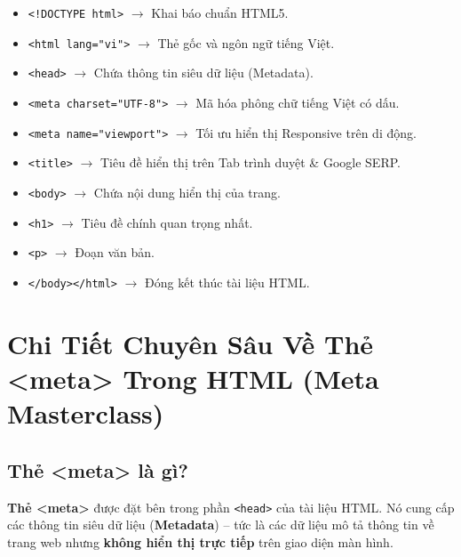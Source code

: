 \documentclass[11pt,oneside]{book}
\newcommand{\codeinline}[1]{\textcolor{accentOrange}{\texttt{#1}}}
\newcommand{\term}[1]{\textbf{\textcolor{primaryBlue}{#1}}}
\begin{document}
\begin{noteBox}
\begin{itemize}[leftmargin=1.2em, itemsep=2pt, parsep=0pt]
    \item \codeinline{<!DOCTYPE html>} $\rightarrow$ Khai báo chuẩn HTML5.
    \item \codeinline{<html lang="vi">} $\rightarrow$ Thẻ gốc và ngôn ngữ tiếng Việt.
    \item \codeinline{<head>} $\rightarrow$ Chứa thông tin siêu dữ liệu (Metadata).
    \item \codeinline{<meta charset="UTF-8">} $\rightarrow$ Mã hóa phông chữ tiếng Việt có dấu.
    \item \codeinline{<meta name="viewport">} $\rightarrow$ Tối ưu hiển thị Responsive trên di động.
    \item \codeinline{<title>} $\rightarrow$ Tiêu đề hiển thị trên Tab trình duyệt \& Google SERP.
    \item \codeinline{<body>} $\rightarrow$ Chứa nội dung hiển thị của trang.
    \item \codeinline{<h1>} $\rightarrow$ Tiêu đề chính quan trọng nhất.
    \item \codeinline{<p>} $\rightarrow$ Đoạn văn bản.
    \item \codeinline{</body></html>} $\rightarrow$ Đóng kết thúc tài liệu HTML.
\end{itemize}
\end{noteBox}

\section{Chi Tiết Chuyên Sâu Về Thẻ <meta> Trong HTML (Meta Masterclass)}
\label{sec:meta_tags_masterclass}

\subsection{Thẻ <meta> là gì?}

\term{Thẻ <meta>} được đặt bên trong phần \codeinline{<head>} của tài liệu HTML. Nó cung cấp các thông tin siêu dữ liệu (\term{Metadata}) -- tức là các dữ liệu mô tả thông tin về trang web nhưng \textbf{không hiển thị trực tiếp} trên giao diện màn hình.
\end{document}
